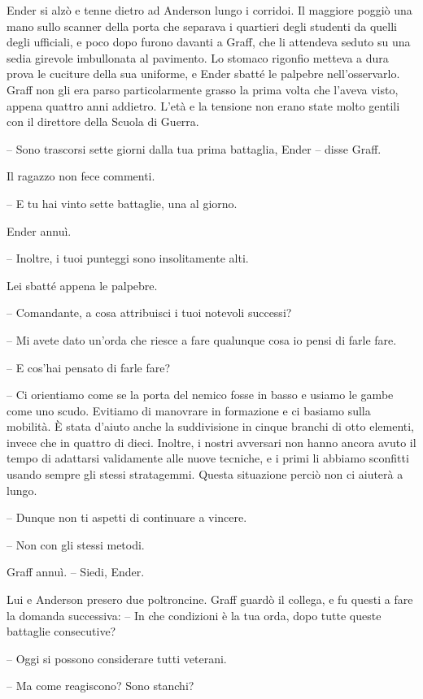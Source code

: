 {Ender si alzò e tenne dietro ad Anderson lungo i corridoi. Il maggiore
	poggiò una mano sullo scanner della porta che separava i quartieri degli
	studenti da quelli degli ufficiali, e poco dopo furono davanti a Graff,
	che li attendeva seduto su una sedia girevole imbullonata al pavimento.
	Lo stomaco rigonfio metteva a dura prova le cuciture della sua uniforme,
	e Ender sbatté le palpebre nell'osservarlo. Graff non gli era parso
	particolarmente grasso la prima volta che l'aveva visto, appena quattro
	anni addietro. L'età e la tensione non erano state molto gentili con il
	direttore della Scuola di Guerra.}

{-- Sono trascorsi sette giorni dalla tua prima battaglia, Ender --
	disse Graff.}

{Il ragazzo non fece commenti.}

{-- E tu hai vinto sette battaglie, una al giorno.}

{Ender annuì.}

{-- Inoltre, i tuoi punteggi sono insolitamente alti.}

{Lei sbatté appena le palpebre.}

{-- Comandante, a cosa attribuisci i tuoi notevoli successi?}

{-- Mi avete dato un'orda che riesce a fare qualunque cosa io pensi di
	farle fare.}

{-- E cos'hai pensato di farle fare?}

{-- Ci orientiamo come se la porta del nemico fosse in basso e usiamo le
	gambe come uno scudo. Evitiamo di manovrare in formazione e ci basiamo
	sulla mobilità. È stata d'aiuto anche la suddivisione in cinque branchi
	di otto elementi, invece che in quattro di dieci. Inoltre, i nostri
	avversari non hanno ancora avuto il tempo di adattarsi validamente alle
	nuove tecniche, e i primi li abbiamo sconfitti usando sempre gli stessi
	stratagemmi. Questa situazione perciò non ci aiuterà a lungo.}

{-- Dunque non ti aspetti di continuare a vincere.}

{-- Non con gli stessi metodi.}

{Graff annuì. -- Siedi, Ender.}

{Lui e Anderson presero due poltroncine. Graff guardò il collega, e fu
	questi a fare la domanda successiva: -- In che condizioni è la tua orda,
	dopo tutte queste battaglie consecutive?}

{-- Oggi si possono considerare tutti veterani.}

{-- Ma come reagiscono? Sono stanchi?}

